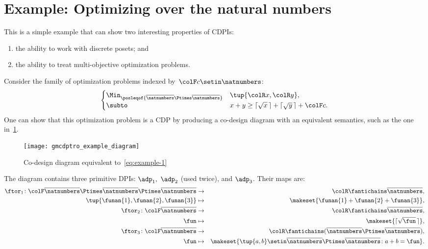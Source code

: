 \section{Example: Optimizing over the natural numbers}

This is a simple example that can show two interesting properties of CDPIs:
\begin{enumerate}
    \item the ability to work with discrete posets; and
    \item the ability to treat multi-objective optimization problems.
\end{enumerate}
Consider the family of optimization problems indexed by~${\colF c}\setin\natnumbers$:
%
\begin{equation}
    \begin{cases}
        \Min_{\posleqof{\overline{\natnumbers}\Ptimes\overline{\natnumbers}}} & \tup{ {\colR x},{\colR y}},                                     \\
        \subto                                                                & x+y\geq\lceil\sqrt{x}\,\rceil+\lceil\sqrt{y}\,\rceil+{\colF c}.
    \end{cases}\label{eq:example-1}
\end{equation}
%
One can show that this optimization problem is a CDP by producing a co-design diagram with an equivalent semantics, such as the one in~\cref{fig:toydiagram}.

\begin{figure}[h]
    \centering
    \texttt{[image: gmcdptro\_example\_diagram]}
    \caption{Co-design diagram equivalent to~\cref{eq:example-1}}
    \label{fig:toydiagram}
\end{figure}

The diagram contains three primitive DPIs: $\adp_{1},$ $\adp_{2}$ (used twice), and $\adp_{3}$.
Their \ftor maps are:
\begin{eqnarray*}
    \ftor_{1}\colon {\colF\overline{\natnumbers}\Ptimes\overline{\natnumbers}\Ptimes\overline{\natnumbers}} & \to & {\colR\fantichains\overline{\natnumbers}},\\
    \tup{ \funan{1},\funan{2},\funan{3}}  & \mapsto & \makeset{\funan{1}+\funan{2}+\funan{3}},\\
    \ftor_{2}\colon {\colF\overline{\natnumbers}} & \rightarrow & {\colR\fantichains\overline{\natnumbers}},\\
    \fun& \mapsto & \makeset{\lceil\sqrt{\fun}\,\rceil},\\
    \ftor_{3}\colon{\colF\overline{\natnumbers}} & \rightarrow & {\colR\fantichains(\overline{\natnumbers}\Ptimes\overline{\natnumbers})},\\
    \fun& \mapsto & \makeset{\tup{ a,b} \setin\overline{\natnumbers}\Ptimes\overline{\natnumbers}\colon a+b=\fun}.
\end{eqnarray*}

